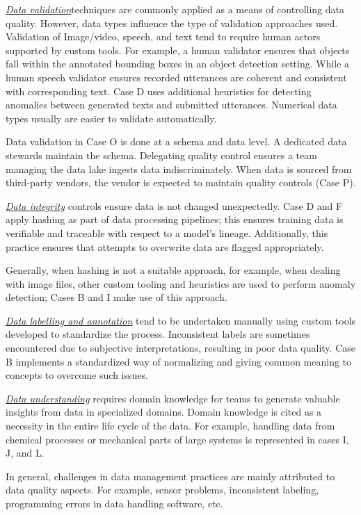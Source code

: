 \underline{\emph{Data validation}}techniques are commonly applied as a means of controlling data quality. However, data types influence the type of validation approaches used. Validation of Image/video, speech, and text tend to require human actors supported by custom tools. For example, a human validator ensures that objects fall within the annotated bounding boxes in an object detection setting. While a human speech validator ensures recorded utterances are coherent and consistent with corresponding text. Case D uses additional heuristics for detecting anomalies between generated texts and submitted utterances. Numerical data types usually are easier to validate automatically.

Data validation in Case O is done at a schema and data level. A dedicated data stewards maintain the schema. Delegating quality control ensures a team managing the data lake ingests data indiscriminately. When data is sourced from third-party vendors, the vendor is expected to maintain quality controls (Case P).


\underline{\emph{Data integrity}}
controls ensure data is not changed unexpectedly. Case D and F apply hashing as part of data processing pipelines; this ensures training data is verifiable and traceable with respect to a model's lineage. Additionally, this practice ensures that attempts to overwrite data are flagged appropriately.

Generally, when hashing is not a suitable approach, for example, when dealing with image files, other custom tooling and heuristics are used to perform anomaly detection; Cases B and I make use of this approach.

\underline{\emph{Data labelling and annotation}} tend to be undertaken manually using custom tools developed to standardize the process. Inconsistent labels are sometimes encountered due to subjective interpretations, resulting in poor data quality. Case B implements a standardized way of normalizing and giving common meaning to concepts to overcome such issues. 

\underline{\emph{Data understanding}} requires domain knowledge for teams to generate valuable insights from data in specialized domains. Domain knowledge is cited as a necessity in the entire life cycle of the data. For example, handling data from chemical processes or mechanical parts of large systems is represented in cases I, J, and L.

In general, challenges in data management practices are mainly attributed to data quality aspects. For example, sensor problems, inconsistent labeling, programming errors in data handling software, etc.



